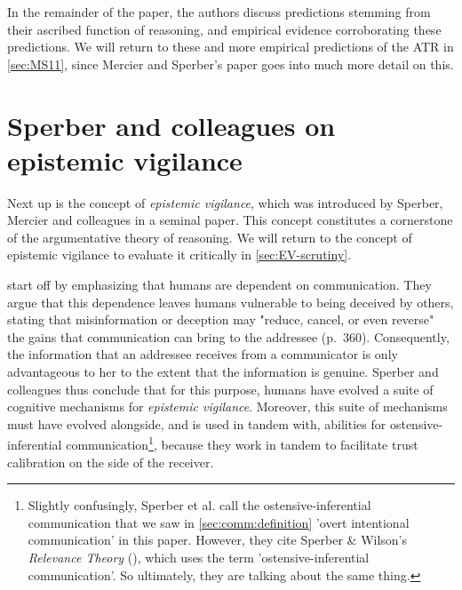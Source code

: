 In the remainder of the paper, the authors discuss predictions stemming from their ascribed function of reasoning, and empirical evidence corroborating these predictions. We will return to these and more empirical predictions of the ATR in \cref{sec:MS11}, since Mercier and Sperber's \citeyear{MS11} paper goes into much more detail on this.

\section{Sperber and colleagues on epistemic vigilance}
\label{sec:Sperber10}

Next up is the concept of \emph{epistemic vigilance}, which was introduced by Sperber, Mercier and colleagues in a seminal \citeyear{Sperber10} paper.
This concept constitutes a cornerstone of the argumentative theory of reasoning. We will return to the concept of epistemic vigilance to evaluate it critically in \cref{sec:EV-scrutiny}.

\citet{Sperber10} start off by emphasizing that humans are dependent on communication. They argue that this dependence leaves humans vulnerable to being deceived by others, stating that misinformation or deception may "reduce, cancel, or even reverse" the gains that communication can bring to the addressee (p.~360).
Consequently, the information that an addressee receives from a communicator is only advantageous to her to the extent that the information is genuine.
Sperber and colleagues thus conclude that for this purpose, humans have evolved a suite of cognitive mechanisms for \emph{epistemic vigilance}.
Moreover, this suite of mechanisms must have evolved alongside, and is used in tandem with, abilities for ostensive-inferential communication\footnote{Slightly confusingly, Sperber et al. call the ostensive-inferential communication that we saw in \cref{sec:comm:definition} 'overt intentional communication' in this paper. However, they cite Sperber \& Wilson's \emph{Relevance Theory} (\citeyear{SperberWilson86}), which uses the term 'ostensive-inferential communication'. So ultimately, they are talking about the same thing.}, because they work in tandem to facilitate trust calibration on the side of the receiver.

